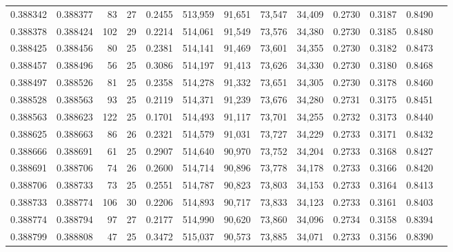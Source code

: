 \begin{tabular}{rrrrrrrrrrrrr}
0.388342 & 0.388377 &    83 &  27 &                                     0.2455 & 513,959 &  91,651 &  73,547 &  34,409 & 0.2730 & 0.3187 & 0.8490 \\
0.388378 & 0.388424 &   102 &  29 &                                     0.2214 & 514,061 &  91,549 &  73,576 &  34,380 & 0.2730 & 0.3185 & 0.8480 \\
0.388425 & 0.388456 &    80 &  25 &                                     0.2381 & 514,141 &  91,469 &  73,601 &  34,355 & 0.2730 & 0.3182 & 0.8473 \\
0.388457 & 0.388496 &    56 &  25 &                                     0.3086 & 514,197 &  91,413 &  73,626 &  34,330 & 0.2730 & 0.3180 & 0.8468 \\
0.388497 & 0.388526 &    81 &  25 &                                     0.2358 & 514,278 &  91,332 &  73,651 &  34,305 & 0.2730 & 0.3178 & 0.8460 \\
0.388528 & 0.388563 &    93 &  25 &                                     0.2119 & 514,371 &  91,239 &  73,676 &  34,280 & 0.2731 & 0.3175 & 0.8451 \\
0.388563 & 0.388623 &   122 &  25 &                                     0.1701 & 514,493 &  91,117 &  73,701 &  34,255 & 0.2732 & 0.3173 & 0.8440 \\
0.388625 & 0.388663 &    86 &  26 &                                     0.2321 & 514,579 &  91,031 &  73,727 &  34,229 & 0.2733 & 0.3171 & 0.8432 \\
0.388666 & 0.388691 &    61 &  25 &                                     0.2907 & 514,640 &  90,970 &  73,752 &  34,204 & 0.2733 & 0.3168 & 0.8427 \\
0.388691 & 0.388706 &    74 &  26 &                                     0.2600 & 514,714 &  90,896 &  73,778 &  34,178 & 0.2733 & 0.3166 & 0.8420 \\
0.388706 & 0.388733 &    73 &  25 &                                     0.2551 & 514,787 &  90,823 &  73,803 &  34,153 & 0.2733 & 0.3164 & 0.8413 \\
0.388733 & 0.388774 &   106 &  30 &                                     0.2206 & 514,893 &  90,717 &  73,833 &  34,123 & 0.2733 & 0.3161 & 0.8403 \\
0.388774 & 0.388794 &    97 &  27 &                                     0.2177 & 514,990 &  90,620 &  73,860 &  34,096 & 0.2734 & 0.3158 & 0.8394 \\
0.388799 & 0.388808 &    47 &  25 &                                     0.3472 & 515,037 &  90,573 &  73,885 &  34,071 & 0.2733 & 0.3156 & 0.8390 \\

\end{tabular}
